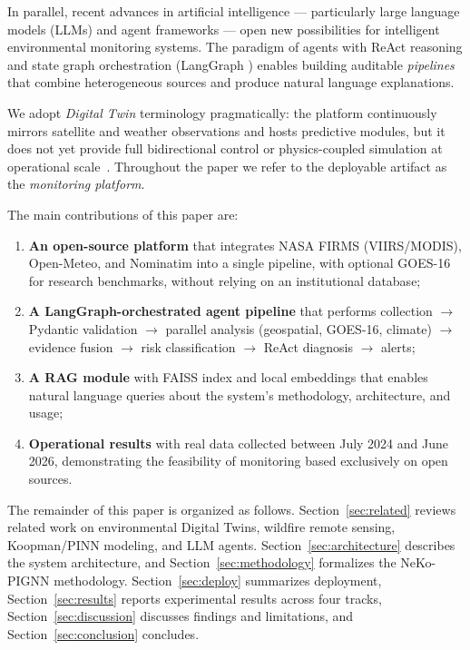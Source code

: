 \documentclass[preprint,12pt,times,numbers]{elsarticle}
\begin{document}
In parallel, recent advances in artificial intelligence --- particularly large language models (LLMs) and agent frameworks --- open new possibilities for intelligent environmental monitoring systems. The paradigm of agents with ReAct reasoning \cite{article:react2023} and state graph orchestration (LangGraph \cite{manual:langgraph2024}) enables building auditable \emph{pipelines} that combine heterogeneous sources and produce natural language explanations.

We adopt \emph{Digital Twin} terminology pragmatically: the platform continuously mirrors satellite and weather observations and hosts predictive modules, but it does not yet provide full bidirectional control or physics-coupled simulation at operational scale~\cite{article:bauer2021natcc}. Throughout the paper we refer to the deployable artifact as the \emph{monitoring platform}.

The main contributions of this paper are:

\begin{enumerate}
    \item \textbf{An open-source platform} that integrates NASA FIRMS (VIIRS/MODIS), Open-Meteo, and Nominatim into a single pipeline, with optional GOES-16 for research benchmarks, without relying on an institutional database;
    \item \textbf{A LangGraph-orchestrated agent pipeline} that performs collection $\rightarrow$ Pydantic validation $\rightarrow$ parallel analysis (geospatial, GOES-16, climate) $\rightarrow$ evidence fusion $\rightarrow$ risk classification $\rightarrow$ ReAct diagnosis $\rightarrow$ alerts;
    \item \textbf{A RAG module} with FAISS index and local embeddings that enables natural language queries about the system's methodology, architecture, and usage;
    \item \textbf{Operational results} with real data collected between July 2024 and June 2026, demonstrating the feasibility of monitoring based exclusively on open sources.
\end{enumerate}

The remainder of this paper is organized as follows. Section~\ref{sec:related} reviews related work on environmental Digital Twins, wildfire remote sensing, Koopman/PINN modeling, and LLM agents. Section~\ref{sec:architecture} describes the system architecture, and Section~\ref{sec:methodology} formalizes the NeKo-PIGNN methodology. Section~\ref{sec:deploy} summarizes deployment, Section~\ref{sec:results} reports experimental results across four tracks, Section~\ref{sec:discussion} discusses findings and limitations, and Section~\ref{sec:conclusion} concludes.
\end{document}
